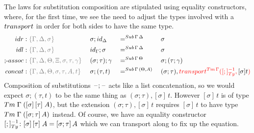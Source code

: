 \documentclass[a4paper,UKenglish,numberwithinsect,cleveref,thm-restate]{lipics-v2021}
\begin{document}
The laws for substitution composition are stipulated using equality constructors, where, for the first time, we see the need to adjust the types involved with a $\transp$ in order for both sides to have the same type.
\begin{alignat*}{5}
  \mathsf{idr}    & : \implicit{\Gamma, \Delta, \sigma} && {\sigma ; \idS_{\Delta}} && =^{\Sub\,\Gamma\,\Delta} && {\sigma} \\
  \mathsf{idl}    & : \implicit{\Gamma, \Delta, \sigma} && {\idS_{\Gamma} ; \sigma} && =^{\Sub\,\Gamma\,\Delta} && {\sigma} \\
  \text{;-}\mathsf{assoc} & : \implicit{\Gamma, \Delta, \Theta, \Xi, \sigma, \tau, \gamma}\; && (\sigma ; \tau) ; \gamma && =^{\Sub\,\Gamma\,\Theta} &&  \sigma ; (\tau ; \gamma) \\
  \mathsf{concat} & : \implicit{\Gamma, \Delta, \Theta, \sigma, \tau, A, t} \; && \sigma ; (\tau , t)      && =^{\Sub\,\Gamma\,(\Theta, A)} \; &&  (\sigma ; \tau) , \alert{\transfib{\Tm\,\Gamma}{[;]_{\Ty}^{-1}}{\color{black}[ \sigma ] t}}
\end{alignat*}
%
Composition of substitutions $\mathord{\hspace{1pt}\text{--}\hspace{1pt}};\mathord{\hspace{1pt}\text{--}\hspace{1pt}}$ acts like a list concatenation, so
we would expect $\sigma; (\tau, t)$ to be the same thing as $(\sigma; \tau), [\sigma]\,t$. However $[\sigma]\,t$ is of type $\Tm\;\Gamma\;([\sigma]\,[\tau]\;A)$, but the extension $(\sigma; \tau), [\sigma]\,t$ requires $[\sigma]\,t$ to have type $\Tm\;\Gamma\;([\sigma; \tau]\,A)$ instead. Of course, we have an equality constructor $[;]_{\Ty}^{-1}\colon [\sigma]\,[\tau]\;A = [\sigma;\tau]\,A$ which we can transport along to fix up the equation.

\end{document}

